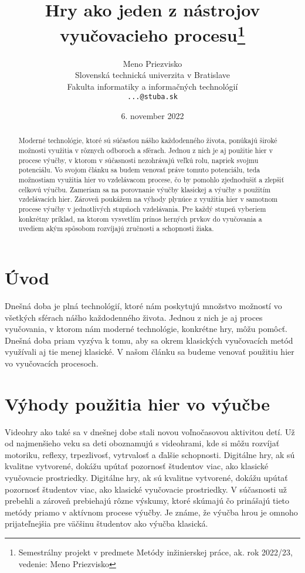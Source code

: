 \documentclass[10pt,twoside,slovak,a4paper]{article}
\title{Hry ako jeden z nástrojov vyučovacieho procesu\thanks{Semestrálny projekt v predmete Metódy inžinierskej práce, ak. rok 2022/23, vedenie: Meno Priezvisko}}
\author{Meno Priezvisko\\[2pt]
	{\small Slovenská technická univerzita v Bratislave}\\
	{\small Fakulta informatiky a informačných technológií}\\
	{\small \texttt{...@stuba.sk}}
	}
\date{\small 6. november 2022}
\begin{document}
\maketitle

\begin{abstract}

Moderné technológie, ktoré sú súčasťou nášho každodenného života, ponúkajú široké možnosti využitia v rôznych odboroch a sférach. Jednou z nich je aj použitie hier v procese výučby\cite{Zea2009-eh}, v ktorom v súčasnosti nezohrávajú veľkú rolu, napriek svojmu potenciálu. Vo svojom článku sa budem venovať práve tomuto potenciálu, teda možnostiam využitia hier vo vzdelávacom procese, čo by pomohlo zjednodušiť a zlepšiť celkovú výučbu. Zameriam sa na porovnanie výučby klasickej a výučby s použitím vzdelávacích hier. Zároveň poukážem na výhody plynúce z využitia hier v samotnom procese výučby v jednotlivých stupňoch vzdelávania. Pre každý stupeň vyberiem konkrétny príklad, na ktorom vysvetlím prínos herných prvkov do vyučovania a uvediem akým spôsobom rozvíjajú zručnosti a schopnosti žiaka.

\end{abstract}



\section{Úvod}

Dnešná doba je plná technológií, ktoré nám poskytujú množstvo možností vo všetkých sférach nášho každodenného života. Jednou z nich je aj proces vyučovania, v ktorom nám moderné technológie, konkrétne hry, môžu pomôcť. Dnešná doba priam vyzýva k tomu, aby sa okrem klasických vyučovacích metód využívali aj tie menej klasické. V našom článku sa budeme venovať použitiu hier vo vyučovacích procesoch.

\section{Výhody použitia hier vo výučbe}

Videohry ako také sa v dnešnej dobe stali novou voľnočasovou aktivitou detí. Už od najmenšieho veku sa deti oboznamujú s videohrami, kde si môžu rozvíjať motoriku, reflexy, trpezlivosť, vytrvalosť a ďalšie schopnosti\cite{Chen2012-ao}. Digitálne hry, ak sú kvalitne vytvorené, dokážu upútať pozornosť študentov viac, ako klasické vyučovacie prostriedky. Digitálne hry, ak sú kvalitne vytvorené, dokážu upútať pozornosť študentov viac, ako klasické vyučovacie prostriedky. V súčasnosti už prebehli a zároveň prebiehajú rôzne výskumy, ktoré skúmajú čo prinášajú tieto metódy priamo v aktívnom procese výučby. Je známe, že výučba hrou je omnoho prijateľnejšia pre väčšinu študentov ako výučba klasická. 
\end{document}
